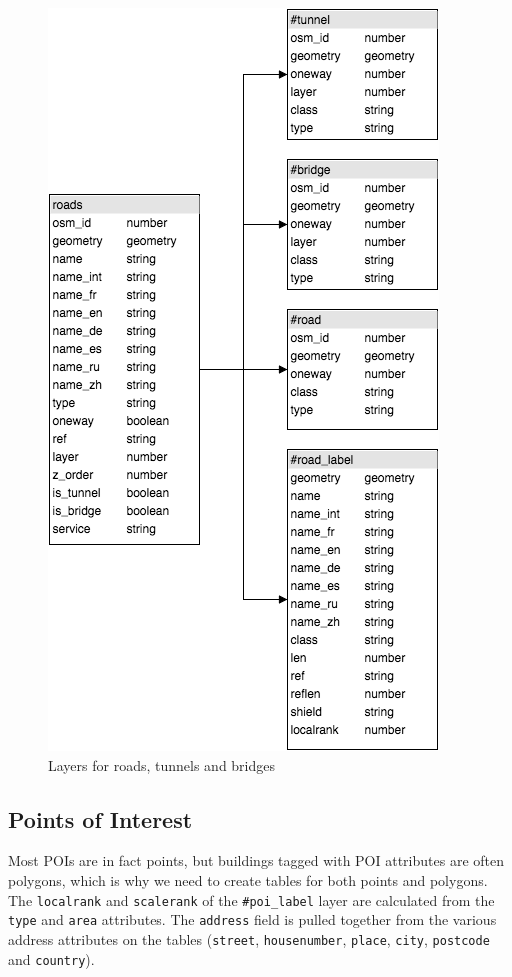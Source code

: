 \begin{figure}[H]
  \centering
  \includegraphics[scale=0.6]{images/road_layer.png}
  \caption{Layers for roads, tunnels and bridges}
\end{figure}

\newpage
\subsection{Points of Interest}
Most POIs are in fact points, but buildings tagged with POI attributes
are often polygons, which is why we need to create tables for both points and polygons.
The \texttt{localrank} and \texttt{scalerank} of the \texttt{\#poi\_label} layer are calculated from the \texttt{type} and \texttt{area} attributes.
The \texttt{address} field is pulled together from the various address attributes on the tables (\texttt{street}, \texttt{housenumber}, \texttt{place}, \texttt{city}, \texttt{postcode} and \texttt{country}).

